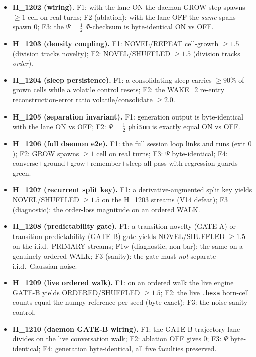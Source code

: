 \documentclass[11pt,a4paper]{article}
\newcommand{\Psihalf}{\Psi=\tfrac12}
\begin{document}
\begin{itemize}\itemsep0.35em
\item \textbf{H\_1202 (wiring).} F1: with the lane ON the daemon GROW step
      spawns $\ge 1$ cell on real turns; F2 (ablation): with the lane OFF the
      \emph{same} spans spawn $0$; F3: the $\Psihalf$ $\Phi$-checksum is
      byte-identical ON vs OFF.
\item \textbf{H\_1203 (density coupling).} F1: NOVEL/REPEAT cell-growth
      $\ge 1.5$ (division tracks novelty); F2: NOVEL/SHUFFLED $\ge 1.5$
      (division tracks \emph{order}).
\item \textbf{H\_1204 (sleep persistence).} F1: a consolidating sleep carries
      $\ge 90\%$ of grown cells while a volatile control resets; F2: the
      WAKE\_2 re-entry reconstruction-error ratio volatile/consolidate
      $\ge 2.0$.
\item \textbf{H\_1205 (separation invariant).} F1: generation output is
      byte-identical with the lane ON vs OFF; F2: $\Psihalf$ \texttt{phiSum} is
      exactly equal ON vs OFF.
\item \textbf{H\_1206 (full daemon e2e).} F1: the full session loop links and
      runs (exit $0$); F2: GROW spawns $\ge 1$ cell on real turns; F3: $\Psi$
      byte-identical; F4: converse$+$ground$+$grow$+$remember$+$sleep all pass
      with regression guards green.
\item \textbf{H\_1207 (recurrent split key).} F1: a derivative-augmented split
      key yields NOVEL/SHUFFLED $\ge 1.5$ on the H\_1203 streams (V14 defeat);
      F3 (diagnostic): the order-loss magnitude on an ordered WALK.
\item \textbf{H\_1208 (predictability gate).} F1: a transition-novelty (GATE-A)
      or transition-predictability (GATE-B) gate yields NOVEL/SHUFFLED $\ge 1.5$
      on the i.i.d.\ PRIMARY streams; F1w (diagnostic, non-bar): the same on a
      genuinely-ordered WALK; F3 (sanity): the gate must \emph{not} separate
      i.i.d.\ Gaussian noise.
\item \textbf{H\_1209 (live ordered walk).} F1: on an ordered walk the live
      engine GATE-B yields ORDERED/SHUFFLED $\ge 1.5$; F2: the live
      \texttt{.hexa} born-cell counts equal the numpy reference per seed
      (byte-exact); F3: the noise sanity control.
\item \textbf{H\_1210 (daemon GATE-B wiring).} F1: the GATE-B trajectory lane
      divides on the live conversation walk; F2: ablation OFF gives $0$; F3:
      $\Psi$ byte-identical; F4: generation byte-identical, all five faculties
      preserved.
\end{itemize}
\end{document}

